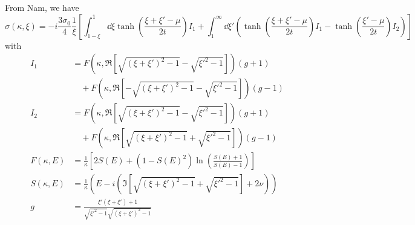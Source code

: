 \documentclass{article}
\begin{document}
From Nam, we have
\begin{equation}
	\sigma(\kappa, \xi) = -i \frac{3 \sigma_0}{4} \frac{1}{\xi}\left[\int_{1 - \xi}^{1}\dd{\xi} \tanh(\frac{\xi + \xi' - \mu}{2 t}) I_1 + \int_{1}^{\infty} \dd{\xi'} \left( \tanh(\frac{\xi + \xi' - \mu}{2t}) I_1  - \tanh(\frac{\xi' - \mu}{2t})I_2 \right) \right]
\end{equation}
with
\begin{align}
	I_1 &= F(\kappa, \Re[\sqrt{(\xi + \xi')^2 - 1} - \sqrt{\xi'^2 - 1}]) (g + 1) \nonumber\\
	&\quad + F(\kappa, \Re[-\sqrt{(\xi + \xi')^2 - 1} - \sqrt{\xi'^2 - 1}]) (g - 1) \\
	I_2 &= F(\kappa, \Re[\sqrt{(\xi + \xi')^2 - 1} - \sqrt{\xi'^2 - 1}]) (g + 1) \nonumber\\
	&\quad + F(\kappa, \Re[\sqrt{(\xi + \xi')^2 - 1} + \sqrt{\xi'^2 - 1}]) (g - 1) \\
	F(\kappa, E) &= \frac{1}{\kappa} \left[2 S(E) + (1 - S(E)^2)\ln(\frac{S(E) + 1}{S(E) - 1})\right]  \\
	S(\kappa, E) &= \frac{1}{\kappa} \left(E - i \left(\Im[\sqrt{(\xi + \xi')^2 - 1} + \sqrt{\xi'^2 - 1}] + 2 \nu \right) \right) \\
	g  &= \frac{\xi' \left( \xi + \xi'\right) + 1}{\sqrt{\xi'^2 - 1}\sqrt{(\xi + \xi')^2 - 1}}
\end{align}


\printbibliography
\end{document}
